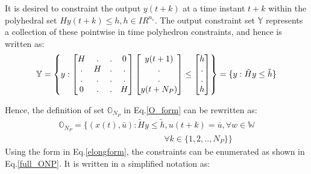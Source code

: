 \documentclass[letterpaper, 10 pt, conference]{ieeeconf}  %
\begin{document}
  	It is desired to constraint the output $y(t+k)$ at a time instant $t+k$ within the polyhedral set $Hy(t+k) \leq h, h \in I\!R^{n_c}$.
  The output constraint set $\mathbb{Y}$ represents a collection of these pointwise in time polyhedron constraints, and hence is written as:
  \begin{equation*}
  \small
  \mathbb{Y}=\begin{Bmatrix}y:
  \begin{bmatrix}
  H & . & . & 0 \\
  . & H & . & .\\
  . & . & . & . \\
  0 & . & . & H
  \end{bmatrix}
  \begin{bmatrix}
  y(t+1) \\ . \\ . \\ y(t+N_P)
  \end{bmatrix}
  \leq \begin{bmatrix}
  h \\ . \\ . \\  h
  \end{bmatrix}
  \end{Bmatrix} = 
  \{ y: \tilde{H} y \leq \tilde{h} \}
  \end{equation*}

  Hence, the definition of set $\mathbb{O}_{N_P}$ in Eq.\eqref{O_form} can be rewritten as:
   \begin{equation}
   \begin{matrix}
   \mathbb{O}_{N_P} = \{(x(t),\bar{u}):\tilde{H}y\leq \tilde{h},  u(t+k)=\bar{u},\forall w \in \mathbb{W}  \\ \hspace{150pt} \forall k \in \{1,2,..,N_P\} \}
   \end{matrix}
   \label{O_form}
   \end{equation}
Using the form in  Eq.\eqref{elongform}, the constraints can be enumerated as shown in Eq.\eqref{full_ONP}. It is written in a simplified notation as:
\end{document}
